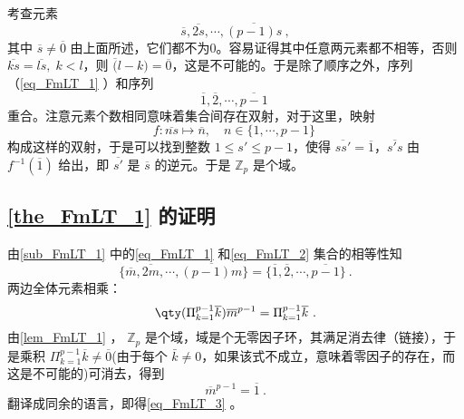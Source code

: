 考查元素 
\begin{equation}\label{eq_FmLT_1}
\overline s,\overline{2s},\cdots,\overline{(p-1)s}~,
\end{equation}
其中 $\overline s\not=\overline 0$ 由上面所述，它们都不为0。容易证得其中任意两元素都不相等，否则 $\overline{ks}=\overline{ls},\;k<l$，则 $\overline(l-k)=\overline 0$，这是不可能的。于是除了顺序之外，序列（\autoref{eq_FmLT_1} ）和序列
\begin{equation}\label{eq_FmLT_2}
\overline 1,\overline 2,\cdots,\overline{p-1}~
\end{equation}
重合。注意元素个数相同意味着集合间存在双射，对于这里，映射
\begin{equation}
f:\overline{ns}\mapsto \overline n,\quad n\in\{1,\cdots,p-1\}~
\end{equation}
构成这样的双射，于是可以找到整数 $1\leq s'\leq p-1$，使得 $\overline{ss'}=\overline 1$，$\overline{s's}$ 由 $f^{-1}(\overline 1)$ 给出，即 $\overline{s'}$ 是 $\overline s$ 的逆元。于是 $\mathbb Z_p$ 是个域。
\subsection{\autoref{the_FmLT_1} 的证明}
由\autoref{sub_FmLT_1} 中的\autoref{eq_FmLT_1} 和\autoref{eq_FmLT_2} 集合的相等性知
\begin{equation}
\{\overline m,\overline{2m},\cdots,\overline{(p-1)m}\}=\{\overline 1,\overline 2,\cdots,\overline{p-1}\}~.
\end{equation}
两边全体元素相乘：
\begin{equation}
\qty(\Pi_{k=1}^{p-1}\overline k)\overline{m}^{p-1}=\Pi_{k=1}^{p-1}\overline k~.
\end{equation}
由\autoref{lem_FmLT_1} ， $\mathbb Z_p$ 是个域，域是个无零因子环，其满足消去律（链接），于是乘积 $\Pi_{k=1}^{p-1}\overline k\neq\overline0$(由于每个 $\bar k\neq0$，如果该式不成立，意味着零因子的存在，而这是不可能的)可消去，得到
\begin{equation}
\overline m^{p-1}=\overline 1~.
\end{equation}
翻译成同余的语言，即得\autoref{eq_FmLT_3} 。








